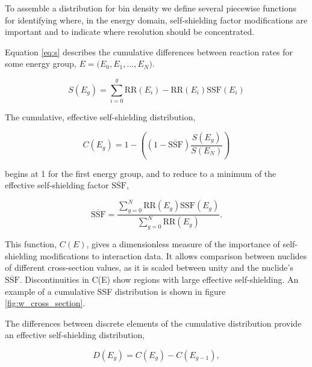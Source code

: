 To assemble a distribution for bin density we define several piecewise functions for identifying where, in the energy domain, self-shielding factor modifications are important and to indicate where resolution should be concentrated. 


Equation \ref{eq:s} describes the cumulative differences between reaction rates for some energy group, ${E = (E_{0}, E_{1}, \dots, E_{N}})$. 

\begin{equation}
\label{eq:s}
S(E_{g}) = \sum_{i=0}^{g} \mathrm{RR}(E_{i}) - \mathrm{RR}(E_{i})\mathrm{SSF}(E_{i})
\end{equation}

The cumulative, effective self-shielding distribution,

\begin{equation}
\label{eq:c}
C(E_{g}) = 1 - \left( \left(1-\overline{\mathrm{SSF}}\right) \frac{S(E_{g})} {S(E_{N})}\right)
\end{equation}

begins at 1 for the first energy group, and to reduce to a minimum of the effective self-shielding factor $\overline{\mathrm{SSF}}$,

\begin{equation}
\label{eq:ssf_bar}
\overline{\mathrm{SSF}} = \frac{\sum_{g=0}^{N}\mathrm{RR}(E_{g})\mathrm{SSF}(E_{g})}
{\sum_{g=0}^{N}\mathrm{RR}(E_{g})}.
\end{equation}

This function, $C(E)$, gives a dimensionless measure of the importance of self-shielding modifications to interaction data. It allows comparison between nuclides of different cross-section values, as it is scaled between unity and the nuclide's $\overline{\mathrm{SSF}}$. Discontinuities in C(E) show regions with large effective self-shielding. An example of a cumulative SSF distribution is shown in figure \ref{fig:w_cross_section}. 

The differences between discrete elements of the cumulative distribution provide an effective self-shielding distribution,

\begin{equation}
\label{eq:d}
D(E_{g}) = C(E_{g}) - C(E_{g-1}),
\end{equation}

